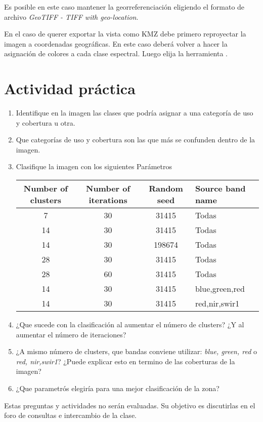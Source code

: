 Es posible en este caso mantener la georreferenciación eligiendo el formato de archivo \emph{GeoTIFF - TIFF with geo-location}.

En el caso de querer exportar la vista como KMZ debe primero reproyectar la imagen a coordenadas geográficas. En este caso deberá volver a hacer la asignación de colores a cada clase espectral. Luego elija la herramienta .


\section{Actividad práctica}

\begin{enumerate}
  \item Identifique en la imagen las clases que podría asignar a una categoría de uso y cobertura u otra.
  \item Que categorías de uso y cobertura son las que más se confunden dentro de la imagen.
  \item Clasifique la imagen con los siguientes Parámetros
  \begin{table}[h]
  \centering
  \begin{tabular}{cccl}
  \toprule
  Number of clusters & Number of iterations & Random seed & Source band name \\ \midrule
  7                  & 30                   & 31415       & Todas            \\
  14                 & 30                   & 31415       & Todas            \\
  14                 & 30                   & 198674      & Todas            \\
  28                 & 30                   & 31415       & Todas            \\
  28                 & 60                   & 31415       & Todas            \\
  14                 & 30                   & 31415       & blue,green,red   \\
  14                 & 30                   & 31415       & red,nir,swir1    \\ \bottomrule
  \end{tabular}
  \end{table}
  \item ¿Que sucede con la clasificación al aumentar el número de clusters? ¿Y al aumentar el número de iteraciones?
  \item ¿A mismo número de clusters, que bandas conviene utilizar: \emph{blue, green, red} o \emph{red, nir,swir1}? ¿Puede explicar esto en termino de las coberturas de la imagen?
  \item ¿Que parametrós elegiría para una mejor clasificación de la zona?
\end{enumerate}

Estas preguntas y actividades no serán evaluadas. Su objetivo es discutirlas en el foro de consultas e intercambio de la clase.
